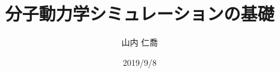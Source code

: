  \begin{titlepage}
  \title{分子動力学シミュレーションの基礎}
  \date{2019/9/8}
  \author{山内 仁喬}
  \maketitle
  \thispagestyle{empty}
 \end{titlepage}
